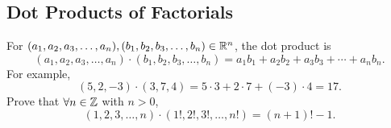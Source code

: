 \subsection{Dot Products of Factorials}
\label{subsections:examples:example4}



\begin{exercise}{
    For %
    $(a_1, a_2, a_3, \dotsc, a_n), (b_1, b_2, b_3, \dotsc, b_n) \in \mathbb{R}^n$,
    the dot product is %
    \[
        (a_1, a_2, a_3, \dotsc, a_n) \cdot (b_1, b_2, b_3, \dotsc, b_n) =
        a_1 b_1 + a_2 b_2 + a_3 b_3 + \dotsb + a_n b_n.
    \]
    For example, %
    \[
        (5, 2, -3) \cdot (3, 7, 4) = 5 \cdot 3 + 2 \cdot 7 + (-3) \cdot 4 = 17.
    \]
    Prove that $\forall n \in \mathbb{Z}$ with $n > 0$, %
    \[
        (1, 2, 3, \dotsc, n) \cdot (1!, 2!, 3!, \dotsc, n!) = (n + 1)! - 1.
    \]
}
\end{exercise}



